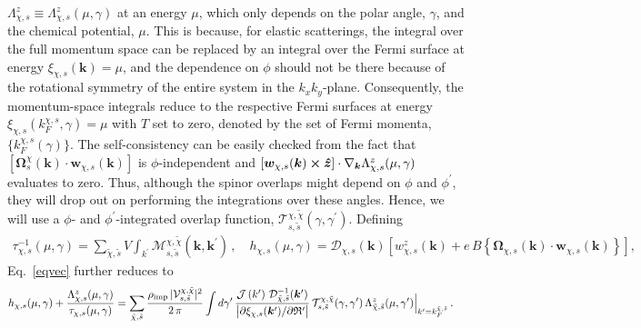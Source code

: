 \documentclass[aps,prb,onecolumn,nofootinbib,citeautoscript,10pt]{revtex4-2}
\begin{document}
$ {\Lambda}^z_{\chi, s} \equiv {\Lambda}^z_{\chi, s} ( \mu, \gamma)$ at an energy $\mu$, which only depends on the polar angle, $\gamma$, and the chemical potential, $\mu$. This is because, for elastic scatterings, the integral over the full momentum space can be replaced by an integral over the Fermi surface at energy $\xi_{\chi , s} (\boldsymbol k) = \mu $, and the dependence on $\phi$ should not be there because of the rotational symmetry of the entire system in the $k_x k_y$-plane. 
Consequently, the momentum-space integrals reduce to the respective Fermi surfaces at energy $\xi_{\chi , s} 
(k_F^{\chi, s} , \gamma)= \mu $ with $T$ set to zero, denoted by the set of Fermi momenta, $ \lbrace k_F^{\chi, s} (\gamma) \rbrace $. The self-consistency can be easily checked from the fact that $\left [ {\boldsymbol \Omega}^\chi_{s} (\boldsymbol k) \cdot
 {\boldsymbol{w}}_{\chi, s} (\boldsymbol k)  \right ] $ is $\phi$-independent and $ \left [  {\boldsymbol{w}}_{\chi, s} 
 (\boldsymbol k)  \cross   \boldsymbol{\hat z}  \right ] 
\cdot \nabla_{\boldsymbol k} {\Lambda}^z_{\chi, s} (\mu, \gamma ) $ evaluates to zero. Thus, although the spinor overlaps might depend on $\phi$ and $\phi^\prime $, they will drop out on performing the integrations over these angles. Hence, we will use a $ \phi$- and $\phi^\prime$-integrated
overlap function, ${\mathcal T }^{\chi, \tilde \chi}_{ s, \tilde s} (\gamma, \gamma^\prime)$. Defining 
\begin{align}
\label{eq_lambda_mu}
\tau^{-1}_{\chi, s}(\mu, \gamma)
= \sum_{\tilde \chi , \tilde s} V \int_{k^\prime }
\mathcal{M}^{\chi, \tilde \chi}_{ s, \tilde s} (\boldsymbol k,\boldsymbol k^\prime) \,, \quad
h_{\chi, s} (\mu, \gamma) = {\mathcal D}_{\chi, s} ({\boldsymbol k})
 \left[ w^z_{\chi, s} ({\boldsymbol k})
+ e \, B \left \lbrace
{\boldsymbol \Omega}_{\chi, s} ({\boldsymbol k}) \cdot {\boldsymbol{w}}_{\chi, s} ({\boldsymbol k})
  \right \rbrace \right],	
\end{align}
Eq.~\eqref{eqvec} further reduces to
\begin{align}
\label{eqlambdamu}
& h_{\chi, s}(\mu, \gamma) + \frac{ {\Lambda}^z_{\chi, s}  (\mu, \gamma)} 
{\tau_{\chi, s}(\mu, \gamma)} =
\sum_{\tilde \chi , \tilde s}  
\frac{ \rho_{\rm imp} 
\, |{\mathcal V} ^{\chi, \tilde \chi}_{ s, \tilde s} |^2 }
{ 2\, \pi }
\int d\gamma^\prime \, \frac{\mathcal J \left (k^\prime \right )
\, {\mathcal D}^{-1}_{\tilde \chi, \tilde s} ({\boldsymbol k}^\prime)}
{  \big | \partial \xi_{\chi, s}({\boldsymbol k}^\prime) /
 \partial \mathfrak{R}^\prime  \big | }
\, {\mathcal T }^{\chi, \tilde \chi}_{ s, \tilde s} (\gamma, \gamma^\prime)
\, {\Lambda}^z_{ \tilde \chi, \tilde s} (\mu, \gamma^\prime ) 
\Big \vert_{ k^\prime = k_F^{ \tilde \chi, \tilde s} } \,.
\end{align}
\end{document}
